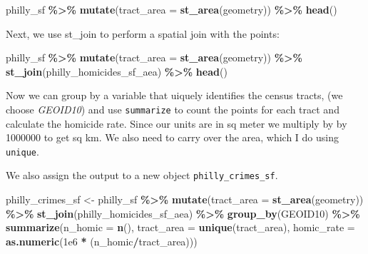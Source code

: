 \documentclass[
]{book}
\newenvironment{Shaded}{\begin{snugshade}}{\end{snugshade}}
\newcommand{\AttributeTok}[1]{\textcolor[rgb]{0.13,0.29,0.53}{#1}}
\newcommand{\FloatTok}[1]{\textcolor[rgb]{0.00,0.00,0.81}{#1}}
\newcommand{\FunctionTok}[1]{\textcolor[rgb]{0.13,0.29,0.53}{\textbf{#1}}}
\newcommand{\NormalTok}[1]{#1}
\newcommand{\OtherTok}[1]{\textcolor[rgb]{0.56,0.35,0.01}{#1}}
\newcommand{\SpecialCharTok}[1]{\textcolor[rgb]{0.81,0.36,0.00}{\textbf{#1}}}
\begin{document}
\begin{Shaded}
\begin{Highlighting}[]
\NormalTok{philly\_sf }\SpecialCharTok{\%\textgreater{}\%} 
  \FunctionTok{mutate}\NormalTok{(}\AttributeTok{tract\_area =} \FunctionTok{st\_area}\NormalTok{(geometry)) }\SpecialCharTok{\%\textgreater{}\%} 
  \FunctionTok{head}\NormalTok{()}
\end{Highlighting}
\end{Shaded}

Next, we use st\_join to perform a spatial join with the points:

\begin{Shaded}
\begin{Highlighting}[]
\NormalTok{philly\_sf }\SpecialCharTok{\%\textgreater{}\%} 
  \FunctionTok{mutate}\NormalTok{(}\AttributeTok{tract\_area =} \FunctionTok{st\_area}\NormalTok{(geometry)) }\SpecialCharTok{\%\textgreater{}\%} 
  \FunctionTok{st\_join}\NormalTok{(philly\_homicides\_sf\_aea) }\SpecialCharTok{\%\textgreater{}\%}
  \FunctionTok{head}\NormalTok{()}
\end{Highlighting}
\end{Shaded}

Now we can group by a variable that uiquely identifies the census tracts, (we choose \emph{GEOID10}) and use \texttt{summarize} to count the points for each tract and calculate the homicide rate. Since our units are in sq meter we multiply by by 1000000 to get sq km. We also need to carry over the area, which I do using \texttt{unique}.

We also assign the output to a new object \texttt{philly\_crimes\_sf}.

\begin{Shaded}
\begin{Highlighting}[]
\NormalTok{philly\_crimes\_sf }\OtherTok{\textless{}{-}}\NormalTok{ philly\_sf }\SpecialCharTok{\%\textgreater{}\%}
      \FunctionTok{mutate}\NormalTok{(}\AttributeTok{tract\_area =} \FunctionTok{st\_area}\NormalTok{(geometry)) }\SpecialCharTok{\%\textgreater{}\%}
      \FunctionTok{st\_join}\NormalTok{(philly\_homicides\_sf\_aea) }\SpecialCharTok{\%\textgreater{}\%}
      \FunctionTok{group\_by}\NormalTok{(GEOID10) }\SpecialCharTok{\%\textgreater{}\%}
      \FunctionTok{summarize}\NormalTok{(}\AttributeTok{n\_homic =} \FunctionTok{n}\NormalTok{(),}
                \AttributeTok{tract\_area =} \FunctionTok{unique}\NormalTok{(tract\_area),}
                \AttributeTok{homic\_rate =} \FunctionTok{as.numeric}\NormalTok{(}\FloatTok{1e6} \SpecialCharTok{*}\NormalTok{ (n\_homic}\SpecialCharTok{/}\NormalTok{tract\_area))) }
\end{Highlighting}
\end{Shaded}
\end{document}
